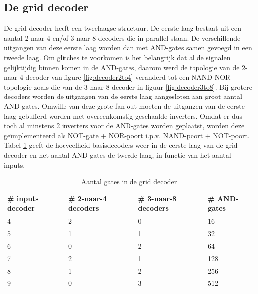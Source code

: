 \subsection{De grid decoder}
De grid decoder heeft een tweelaagse structuur. De eerste laag bestaat uit een aantal 2-naar-4 en/of 3-naar-8 decoders die in parallel staan. De verschillende uitgangen van deze eerste laag worden dan met AND-gates samen gevoegd in een tweede laag. Om glitches te voorkomen is het belangrijk dat al de signalen gelijktijdig binnen komen in de AND-gates, daarom werd de topologie van de 2-naar-4 decoder van figure \ref{fig:decoder2to4} veranderd tot een NAND-NOR topologie zoals die van de 3-naar-8 decoder in figuur \ref{fig:decoder3to8}. Bij grotere decoders worden de uitgangen van de eerste laag aangesloten aan groot aantal AND-gates. Omwille van deze grote fan-out moeten de uitgangen van de eerste laag gebufferd worden met overeenkomstig geschaalde inverters. Omdat er dus toch al minstens 2 inverters voor de AND-gates worden geplaatst, worden deze geïmplementeerd als NOT-gate + NOR-poort i.p.v. NAND-poort + NOT-poort. Tabel \ref{tab:griddecoder} geeft de hoeveelheid basisdecoders weer in de eerste laag van de grid decoder en het aantal AND-gates de tweede laag, in functie van het aantal inputs.

\begin{table}
\begin{center}
\begin{tabular}{llll}
\hline
\# inputs decoder & \# 2-naar-4 decoders & \# 3-naar-8 decoders & \# AND-gates\\
\hline
4 & 2 & 0 & 16\\
5 & 1 & 1 & 32\\
6 & 0 & 2 & 64\\
7 & 2 & 1 & 128\\
8 & 1 & 2 & 256\\
9 & 0 & 3 & 512\\
\hline
\end{tabular}
\end{center}
\caption[aantal gates in de grid decoder]{Aantal gates in de grid decoder}
\label{tab:griddecoder}
\end{table}

